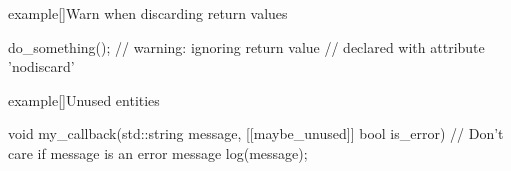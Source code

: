 \begin{frame}[fragile]{}
\begin{onlyenv}
\begin{varblock}{example}[\textwidth]{Warn when discarding return values}
\begin{Cpp}
                do_something(); // warning: ignoring return value
                // declared with attribute 'nodiscard'
            \end{Cpp}
        \end{varblock}
        \bigskip
        \begin{varblock}{example}[\textwidth]{Unused entities}
            \begin{Cpp}
                void my_callback(std::string message,
                                 [[maybe_unused]] bool is_error) {
                    // Don't care if message is an error message
                    log(message);
                }
            \end{Cpp}
        \end{varblock}
    \end{onlyenv}
\end{frame}
